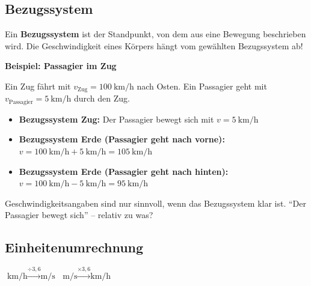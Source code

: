 \documentclass[11pt, a4paper]{article}
\newcommand{\wichtig}[1]{\textcolor{physik}{\textbf{#1}}}
\begin{document}
\subsection{Bezugssystem}

\begin{merksatz}
Ein \wichtig{Bezugssystem} ist der Standpunkt, von dem aus eine Bewegung beschrieben wird. Die Geschwindigkeit eines Körpers hängt vom gewählten Bezugssystem ab!
\end{merksatz}

\begin{beispielbox}
\textbf{Beispiel: Passagier im Zug}

Ein Zug fährt mit $v_{\text{Zug}} = \SI{100}{\kilo\metre\per\hour}$ nach Osten. Ein Passagier geht mit $v_{\text{Passagier}} = \SI{5}{\kilo\metre\per\hour}$ durch den Zug.

\begin{itemize}[leftmargin=1em]
    \item \textbf{Bezugssystem Zug:} Der Passagier bewegt sich mit $v = \SI{5}{\kilo\metre\per\hour}$
    \item \textbf{Bezugssystem Erde (Passagier geht nach vorne):} $v = \SI{100}{\kilo\metre\per\hour} + \SI{5}{\kilo\metre\per\hour} = \SI{105}{\kilo\metre\per\hour}$
    \item \textbf{Bezugssystem Erde (Passagier geht nach hinten):} $v = \SI{100}{\kilo\metre\per\hour} - \SI{5}{\kilo\metre\per\hour} = \SI{95}{\kilo\metre\per\hour}$
\end{itemize}
\end{beispielbox}

\begin{warnbox}
Geschwindigkeitsangaben sind nur sinnvoll, wenn das Bezugssystem klar ist. ``Der Passagier bewegt sich'' -- relativ zu was?
\end{warnbox}

\subsection{Einheitenumrechnung}

\begin{formelbox}[title=Umrechnung km/h $\leftrightarrow$ m/s]
\begin{center}
{\large $\si{\kilo\metre\per\hour} \xrightarrow{\div 3{,}6} \si{\metre\per\second}$ \hspace{3cm} $\si{\metre\per\second} \xrightarrow{\times 3{,}6} \si{\kilo\metre\per\hour}$}
\end{center}
\end{formelbox}
\end{document}
